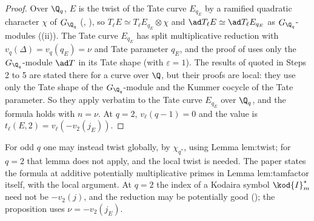\begin{proof}
Over $\Q_q$, $E$ is the twist of the Tate curve $E_{q_E}$ by a ramified quadratic character $\chi$ of $G_{\Q_q}$ (, ), so $T_\ell E\simeq T_\ell E_{q_E}\otimes\chi$
and $\ad T_\ell E\simeq\ad T_\ell E_{q_E}$ as $G_{\Q_q}$-modules ((ii)). The Tate curve $E_{q_E}$ has split multiplicative reduction with
$v_q(\Delta)=v_q(q_E)=\nu$ and Tate parameter $q_E$, and the proof of  uses only the $G_{\Q_q}$-module $\ad T$ in its Tate shape (with $\varepsilon=1$). The
results of  quoted in Steps 2 to 5 are stated there for a curve over $\Q$, but their proofs are local: they use only the Tate shape of the
$G_{\Q_q}$-module and the Kummer cocycle of the Tate parameter. So they apply verbatim to the Tate curve $E_{q_E}$ over $\Q_q$, and the formula holds with $n=\nu$. At $q=2$, $v_\ell(q-1)=0$ and the value is $t_\ell(E,2)=v_\ell(-v_2(j_E))$.
\end{proof}

For odd $q$ one may instead twist globally, by $\chi_{q^*}$, using Lemma lem:twist; for $q=2$ that lemma does not apply, and the local twist is needed. The paper
states the formula at additive potentially multiplicative primes in Lemma lem:tamfactor itself, with the local argument. At $q=2$ the index of a Kodaira symbol $\kod{I}_m^*$ need not be $-v_2(j)$, and the reduction may be potentially good (); the
proposition uses $\nu=-v_2(j_E)$.

